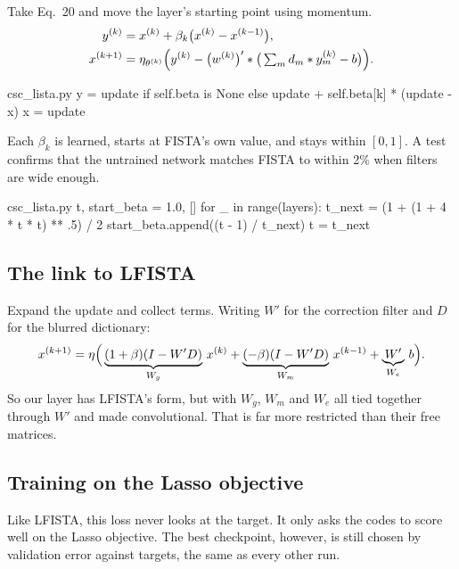 Take Eq.~20 and move the layer's starting point using momentum.
\begin{align}
y^{(k)} &= x^{(k)} + \beta_k\big(x^{(k)} - x^{(k-1)}\big),\\
x^{(k+1)} &= \eta_{\theta^{(k)}}\Big(y^{(k)} - \big(w^{(k)}\big)' * \big(\textstyle\sum_m d_m*y_m^{(k)} - b\big)\Big).
\end{align}

\begin{code*}{csc_lista.py}
            y = update if self.beta is None else update + self.beta[k] * (update - x)
            x = update
\end{code*}

Each $\beta_k$ is learned, starts at FISTA's own value, and stays within $[0,1]$. A test confirms that the untrained
network matches FISTA to within 2\% when filters are wide enough.

\begin{code*}{csc_lista.py}
            t, start_beta = 1.0, []
            for _ in range(layers):
                t_next = (1 + (1 + 4 * t * t) ** .5) / 2
                start_beta.append((t - 1) / t_next)
                t = t_next
\end{code*}

\subsection*{The link to LFISTA}

Expand the update and collect terms. Writing $W'$ for the correction filter and $D$ for the blurred dictionary:
\begin{equation}
x^{(k+1)} = \eta\Big(\underbrace{(1+\beta)(I-W'D)}_{W_g}\,x^{(k)}
+ \underbrace{(-\beta)(I-W'D)}_{W_m}\,x^{(k-1)}
+ \underbrace{W'}_{W_e}\,b\Big).
\end{equation}
So our layer has LFISTA's form, but with $W_g$, $W_m$ and $W_e$ all tied together through $W'$ and made convolutional.
That is far more restricted than their free matrices.

\subsection*{Training on the Lasso objective}

Like LFISTA, this loss never looks at the target. It only asks the codes to score well on the Lasso objective. The
best checkpoint, however, is still chosen by validation error against targets, the same as every other run.

